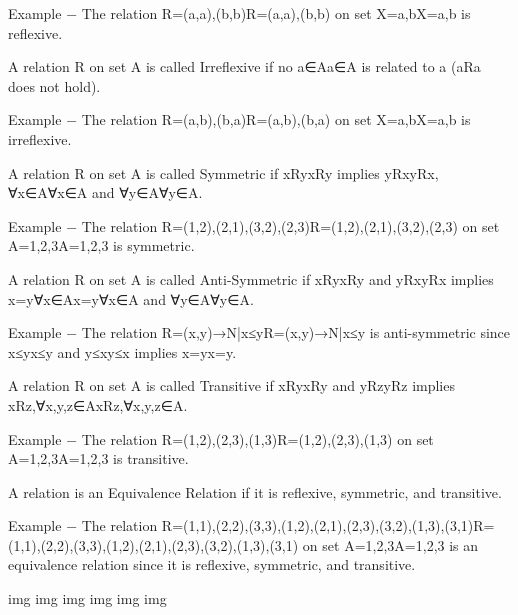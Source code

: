 Example − The relation R={(a,a),(b,b)}R={(a,a),(b,b)} on set X={a,b}X={a,b} is reflexive.

A relation R on set A is called Irreflexive if no a∈Aa∈A is related to a (aRa does not hold).

Example − The relation R={(a,b),(b,a)}R={(a,b),(b,a)} on set X={a,b}X={a,b} is irreflexive.

A relation R on set A is called Symmetric if xRyxRy implies yRxyRx, ∀x∈A∀x∈A and ∀y∈A∀y∈A.

Example − The relation R={(1,2),(2,1),(3,2),(2,3)}R={(1,2),(2,1),(3,2),(2,3)} on set A={1,2,3}A={1,2,3} is symmetric.

A relation R on set A is called Anti-Symmetric if xRyxRy and yRxyRx implies x=y∀x∈Ax=y∀x∈A and ∀y∈A∀y∈A.

Example − The relation R={(x,y)→N|x≤y}R={(x,y)→N|x≤y} is anti-symmetric since x≤yx≤y and y≤xy≤x implies x=yx=y.

A relation R on set A is called Transitive if xRyxRy and yRzyRz implies xRz,∀x,y,z∈AxRz,∀x,y,z∈A.

Example − The relation R={(1,2),(2,3),(1,3)}R={(1,2),(2,3),(1,3)} on set A={1,2,3}A={1,2,3} is transitive.

A relation is an Equivalence Relation if it is reflexive, symmetric, and transitive.

Example − The relation R={(1,1),(2,2),(3,3),(1,2),(2,1),(2,3),(3,2),(1,3),(3,1)}R={(1,1),(2,2),(3,3),(1,2),(2,1),(2,3),(3,2),(1,3),(3,1)} on set A={1,2,3}A={1,2,3} is an equivalence relation since it is reflexive, symmetric, and transitive.


 
 img  img  img  img  img  img

 

 
